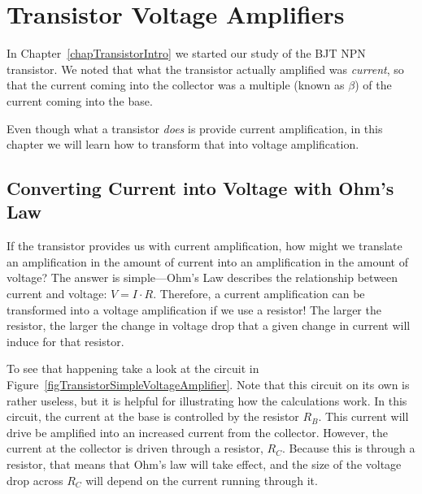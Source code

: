 \chapter{Transistor Voltage Amplifiers}
\label{chapTransVoltageAmp}



In Chapter~\ref{chapTransistorIntro} we started our study of the BJT NPN transistor.
We noted that what the transistor actually amplified was \emph{current}, so that the current coming into the collector was a multiple (known as $\beta$) of the current coming into the base.

Even though what a transistor \emph{does} is provide current amplification, in this chapter we will learn how to transform that into voltage amplification.

\section{Converting Current into Voltage with Ohm's Law}

If the transistor provides us with current amplification, how might we translate an amplification in the amount of current into an amplification in the amount of voltage?
The answer is simple---Ohm's Law describes the relationship between current and voltage: $V = I\cdot R$.
Therefore, a current amplification can be transformed into a voltage amplification if we use a resistor!
The larger the resistor, the larger the change in voltage drop that a given change in current will induce for that resistor.


To see that happening take a look at the circuit in Figure~\ref{figTransistorSimpleVoltageAmplifier}.  
Note that this circuit on its own is rather useless, but it is helpful for illustrating how the calculations work.
In this circuit, the current at the base is controlled by the resistor $R_B$.
This current will drive be amplified into an increased current from the collector.
However, the current at the collector is driven through a resistor, $R_C$.
Because this is through a resistor, that means that Ohm's law will take effect, and the size of the voltage drop across $R_C$ will depend on the current running through it.

